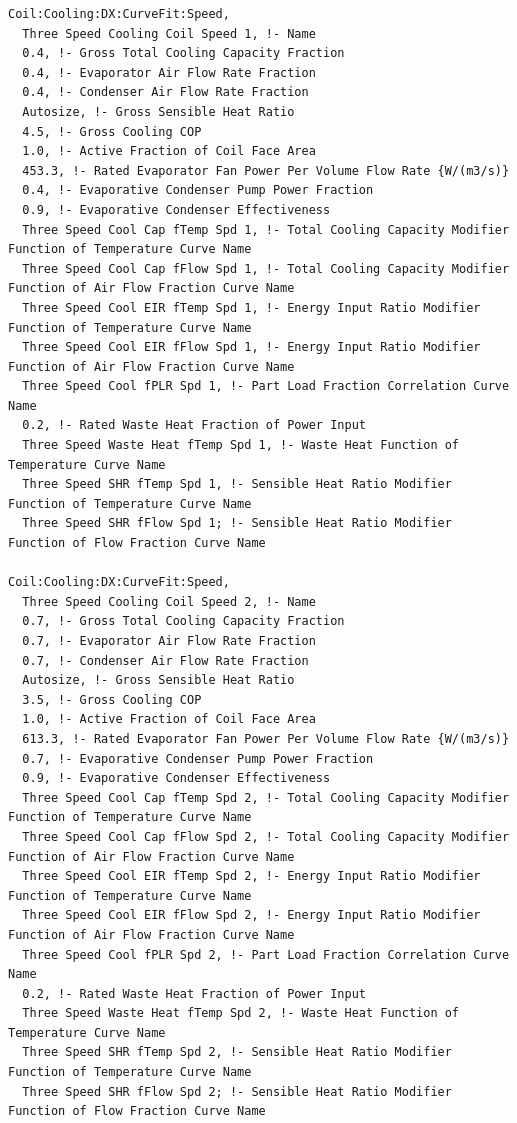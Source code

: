 \begin{lstlisting}
Coil:Cooling:DX:CurveFit:Speed,
  Three Speed Cooling Coil Speed 1, !- Name
  0.4, !- Gross Total Cooling Capacity Fraction
  0.4, !- Evaporator Air Flow Rate Fraction
  0.4, !- Condenser Air Flow Rate Fraction
  Autosize, !- Gross Sensible Heat Ratio
  4.5, !- Gross Cooling COP
  1.0, !- Active Fraction of Coil Face Area
  453.3, !- Rated Evaporator Fan Power Per Volume Flow Rate {W/(m3/s)}
  0.4, !- Evaporative Condenser Pump Power Fraction
  0.9, !- Evaporative Condenser Effectiveness
  Three Speed Cool Cap fTemp Spd 1, !- Total Cooling Capacity Modifier Function of Temperature Curve Name
  Three Speed Cool Cap fFlow Spd 1, !- Total Cooling Capacity Modifier Function of Air Flow Fraction Curve Name
  Three Speed Cool EIR fTemp Spd 1, !- Energy Input Ratio Modifier Function of Temperature Curve Name
  Three Speed Cool EIR fFlow Spd 1, !- Energy Input Ratio Modifier Function of Air Flow Fraction Curve Name
  Three Speed Cool fPLR Spd 1, !- Part Load Fraction Correlation Curve Name
  0.2, !- Rated Waste Heat Fraction of Power Input
  Three Speed Waste Heat fTemp Spd 1, !- Waste Heat Function of Temperature Curve Name
  Three Speed SHR fTemp Spd 1, !- Sensible Heat Ratio Modifier Function of Temperature Curve Name
  Three Speed SHR fFlow Spd 1; !- Sensible Heat Ratio Modifier Function of Flow Fraction Curve Name

Coil:Cooling:DX:CurveFit:Speed,
  Three Speed Cooling Coil Speed 2, !- Name
  0.7, !- Gross Total Cooling Capacity Fraction
  0.7, !- Evaporator Air Flow Rate Fraction
  0.7, !- Condenser Air Flow Rate Fraction
  Autosize, !- Gross Sensible Heat Ratio
  3.5, !- Gross Cooling COP
  1.0, !- Active Fraction of Coil Face Area
  613.3, !- Rated Evaporator Fan Power Per Volume Flow Rate {W/(m3/s)}
  0.7, !- Evaporative Condenser Pump Power Fraction
  0.9, !- Evaporative Condenser Effectiveness
  Three Speed Cool Cap fTemp Spd 2, !- Total Cooling Capacity Modifier Function of Temperature Curve Name
  Three Speed Cool Cap fFlow Spd 2, !- Total Cooling Capacity Modifier Function of Air Flow Fraction Curve Name
  Three Speed Cool EIR fTemp Spd 2, !- Energy Input Ratio Modifier Function of Temperature Curve Name
  Three Speed Cool EIR fFlow Spd 2, !- Energy Input Ratio Modifier Function of Air Flow Fraction Curve Name
  Three Speed Cool fPLR Spd 2, !- Part Load Fraction Correlation Curve Name
  0.2, !- Rated Waste Heat Fraction of Power Input
  Three Speed Waste Heat fTemp Spd 2, !- Waste Heat Function of Temperature Curve Name
  Three Speed SHR fTemp Spd 2, !- Sensible Heat Ratio Modifier Function of Temperature Curve Name
  Three Speed SHR fFlow Spd 2; !- Sensible Heat Ratio Modifier Function of Flow Fraction Curve Name


\end{lstlisting}
